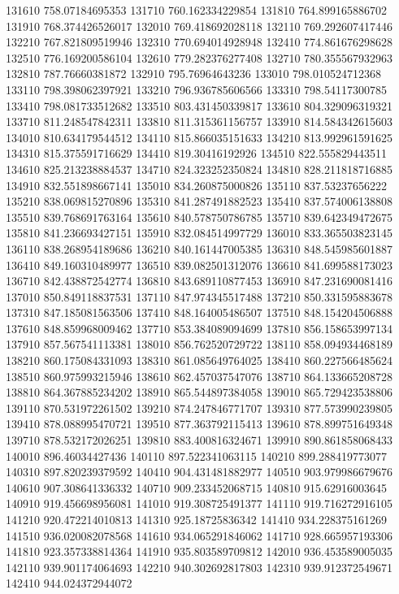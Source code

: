 {131610 758.07184695353
131710 760.162334229854
131810 764.899165886702
131910 768.374426526017
132010 769.418692028118
132110 769.292607417446
132210 767.821809519946
132310 770.694014928948
132410 774.861676298628
132510 776.169200586104
132610 779.282376277408
132710 780.355567932963
132810 787.76660381872
132910 795.76964643236
133010 798.010524712368
133110 798.398062397921
133210 796.936785606566
133310 798.54117300785
133410 798.081733512682
133510 803.431450339817
133610 804.329096319321
133710 811.248547842311
133810 811.315361156757
133910 814.584342615603
134010 810.634179544512
134110 815.866035151633
134210 813.992961591625
134310 815.375591716629
134410 819.30416192926
134510 822.555829443511
134610 825.213238884537
134710 824.323252350824
134810 828.211818716885
134910 832.551898667141
135010 834.260875000826
135110 837.53237656222
135210 838.069815270896
135310 841.287491882523
135410 837.574006138808
135510 839.768691763164
135610 840.578750786785
135710 839.642349472675
135810 841.236693427151
135910 832.084514997729
136010 833.365503823145
136110 838.268954189686
136210 840.161447005385
136310 848.545985601887
136410 849.160310489977
136510 839.082501312076
136610 841.699588173023
136710 842.438872542774
136810 843.689110877453
136910 847.231690081416
137010 850.849118837531
137110 847.974345517488
137210 850.331595883678
137310 847.185081563506
137410 848.164005486507
137510 848.154204506888
137610 848.859968009462
137710 853.384089094699
137810 856.158653997134
137910 857.567541113381
138010 856.762520729722
138110 858.094934468189
138210 860.175084331093
138310 861.085649764025
138410 860.227566485624
138510 860.975993215946
138610 862.457037547076
138710 864.133665208728
138810 864.367885234202
138910 865.544897384058
139010 865.729423538806
139110 870.531972261502
139210 874.247846771707
139310 877.573990239805
139410 878.088995470721
139510 877.363792115413
139610 878.899751649348
139710 878.532172026251
139810 883.400816324671
139910 890.861858068433
140010 896.46034427436
140110 897.522341063115
140210 899.288419773077
140310 897.820239379592
140410 904.431481882977
140510 903.979986679676
140610 907.308641336332
140710 909.233452068715
140810 915.62916003645
140910 919.456698956081
141010 919.308725491377
141110 919.716272916105
141210 920.472214010813
141310 925.18725836342
141410 934.228375161269
141510 936.020082078568
141610 934.065291846062
141710 928.665957193306
141810 923.357338814364
141910 935.803589709812
142010 936.453589005035
142110 939.901174064693
142210 940.302692817803
142310 939.912372549671
142410 944.024372944072
}
